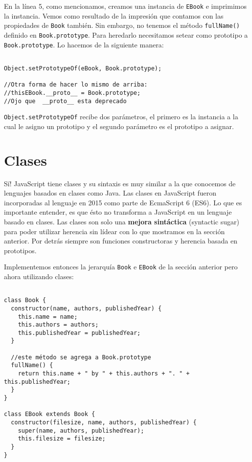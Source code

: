\documentclass[a4paper, oneside, titlepage, 12pt]{paper}
\begin{document}
En la línea 5, como mencionamos, creamos una instancia de \texttt{EBook} e imprimimos la instancia. Vemos como resultado de la impresión que contamos con las propiedades de \texttt{Book} también. Sin embargo, no tenemos el método \texttt{fullName()} definido en \texttt{Book.prototype}. Para heredarlo necesitamos setear como prototipo a \texttt{Book.prototype}. Lo hacemos de la siguiente manera:

\begin{verbatim}

Object.setPrototypeOf(eBook, Book.prototype);

//Otra forma de hacer lo mismo de arriba:
//thisEBook.__proto__ = Book.prototype;
//Ojo que  __proto__ esta deprecado
\end{verbatim}

\texttt{Object.setPrototypeOf} recibe dos parámetros, el primero es la instancia a la cual le asigno un prototipo y el segundo parámetro es el prototipo a asignar.

\section{Clases}

Sí! JavaScript tiene clases y su sintaxis es muy similar a la que conocemos de lenguajes basados en clases como Java. Las clases en JavaScript fueron incorporadas al lenguaje en 2015 como parte de EcmaScript 6 (ES6). Lo que es importante entender, es que ésto no transforma a JavaScript en un lenguaje basado en clases. Las clases son solo una \textbf{mejora sintáctica} (syntactic sugar) para poder utilizar herencia sin lídear con lo que mostramos en la sección anterior. Por detrás siempre son funciones constructoras y herencia basada en prototipos.
\newline

Implementemos entonces la jerarquía \texttt{Book} e \texttt{EBook} de la sección anterior pero ahora utilizando clases:

\begin{verbatim}

class Book {
  constructor(name, authors, publishedYear) {
    this.name = name;
    this.authors = authors;
    this.publishedYear = publishedYear;
  }

  //este método se agrega a Book.prototype
  fullName() {
    return this.name + " by " + this.authors + ". " + this.publishedYear;
  }
}

class EBook extends Book {
  constructor(filesize, name, authors, publishedYear) {
    super(name, authors, publishedYear);
    this.filesize = filesize;
  }
}
\end{verbatim}
\end{document}
